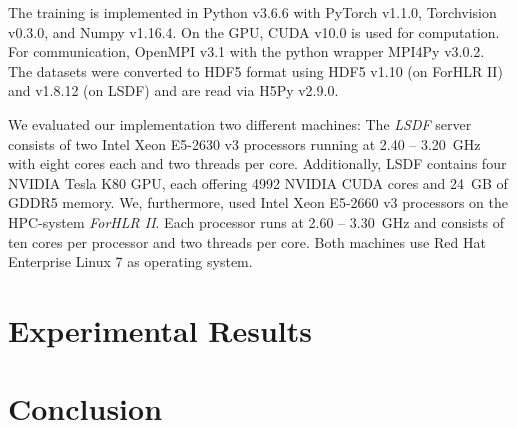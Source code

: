 \documentclass[conference,compsoc,a4paper]{IEEEtran}
\begin{document}
The training is implemented in Python v3.6.6 with PyTorch v1.1.0, Torchvision v0.3.0, and Numpy v1.16.4.
On the GPU, CUDA v10.0 is used for computation.
For communication, OpenMPI v3.1 with the python wrapper MPI4Py v3.0.2.
The datasets were converted to HDF5 format using HDF5 v1.10 (on ForHLR II) and v1.8.12 (on LSDF) and are read via H5Py v2.9.0.

We evaluated our implementation two different machines:
The \emph{LSDF} server consists of two Intel Xeon E5-2630 v3 processors running at 2.40 – 3.20~GHz with eight cores each and two threads per core.
Additionally, LSDF contains four NVIDIA Tesla K80 GPU, each offering 4992 NVIDIA CUDA cores and 24~GB of GDDR5 memory.
%
We, furthermore, used Intel Xeon E5-2660 v3 processors on the HPC-system \emph{ForHLR II}. %
Each processor runs at 2.60 – 3.30~GHz and consists of ten cores per processor and two threads per core.
%
Both machines use Red Hat Enterprise Linux 7 as operating system.



\section{Experimental Results} %
\label{sec:experimental_results}


\section{Conclusion} %
\label{sec:conclusion}





\end{document}
